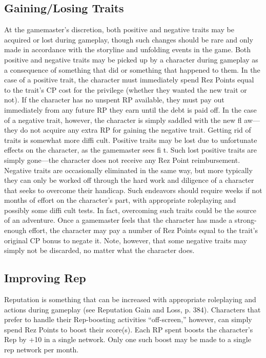 \subsection{Gaining/Losing Traits}
At the gamemaster’s discretion, both positive and negative traits may be
acquired or lost during gameplay, though such changes should be rare and only
made in accordance with the storyline and unfolding events in the game.  Both
positive and negative traits may be picked up by a character during gameplay as
a consequence of something that did or something that happened to them. In the
case of a positive trait, the character must immediately spend Rez Points equal
to the trait’s CP cost for the privilege (whether they wanted the new trait or
not). If the character has no unspent RP available, they must pay out
immediately from any future RP they earn until the debt is paid off. In the
case of a negative trait, however, the character is simply saddled with the new
fl aw—they do not acquire any extra RP for gaining the negative trait.  Getting
rid of traits is somewhat more diffi cult. Positive traits may be lost due to
unfortunate effects on the character, as the gamemaster sees fi t. Such lost
positive traits are simply gone—the character does not receive any Rez Point
reimbursement. Negative traits are occasionally eliminated in the same way, but
more typically they can only be worked off through the hard work and diligence
of a character that seeks to overcome their handicap. Such endeavors should
require weeks if not months of effort on the character’s part, with appropriate
roleplaying and possibly some diffi cult tests. In fact, overcoming such traits
could be the source of an adventure. Once a gamemaster feels that the character
has made a strong-enough effort, the character may pay a number of Rez Points
equal to the trait’s original CP bonus to negate it. Note, however, that some
negative traits may simply not be discarded, no matter what the character does.

\subsection{Improving Rep}
Reputation is something that can be increased with appropriate roleplaying and
actions during gameplay (see Reputation Gain and Loss, p. 384). Characters that
prefer to handle their Rep-boosting activities “off-screen,” however, can
simply spend Rez Points to boost their score(s). Each RP spent boosts the
character’s Rep by +10 in a single network. Only one such boost may be made to
a single rep network per month.

